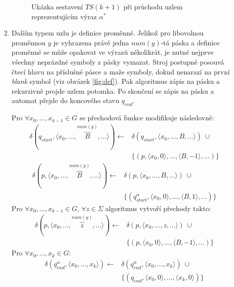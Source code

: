 \documentclass[thesis=B,czech]{FITthesis}[2019/12/23]
\theoremstyle{definition}
\begin{document}
\begin{enumerate}
\begin{enumerate}
\begin{figure}[ht]
\begin{tikzpicture}[scale=0.8]
	\end{tikzpicture}
	\caption{Ukázka sestavení $TS(k+1)$ při průchodu uzlem reprezentujícím výraz $\alpha^\ast$}
	\label{fig:iter}
\end{figure}

	 \item \label{itm:def}{Dalším typem uzlu je definice proměnné. Jelikož pro libovolnou proměnnou $y$ je vyhrazena právě jedna $num(y)$-tá páska a definice proměnné se může opakovat ve výrazů několikrát, je nutné nejprve všechny neprázdné symboly z pásky vymazat. Stroj postupně posouvá čtecí hlavu na příslušné pásce a maže symboly, dokud nenarazí na první \emph{blank} symbol (viz obrázek \ref{fig:def}). Pak algoritmus  zápis na pásku a rekurzivně projde uzlem potomka. Po skončení se  zápis na pásku a automat přejde do koncového stavu $q_{end}$. 

	Pro  $\forall x_0, \dots, x_{k-1} \in G$ se přechodová funkce modifikuje následovně:
		\begin{equation*}\begin{split}
		\delta(q_{start}, \langle  x_0, \dots, \overbrace{B}^{num(y)}, \dots \rangle)\leftarrow&\delta(q_{start}, \langle  x_0, \dots, B, \dots \rangle) \ \cup\\&\{(p, \langle x_0, 0\rangle, \dots, \langle B, -1\rangle, \dots)\}\end{split}\end{equation*}
		\begin{equation*}\begin{split}
		\delta(p, \langle  x_0, \dots, \overbrace{B}^{num(y)}, \dots \rangle)\leftarrow&\delta(p, \langle  x_0, \dots, B, \dots \rangle) \ \cup\\&\{(q_{start}^{\alpha}, \langle x_0, 0\rangle, \dots, \langle B, 1\rangle, \dots)\}\end{split}\end{equation*}
	Pro $\forall x_0, \dots, x_{k-1} \in G$,  $\forall z \in \Sigma$ algoritmus vytvoří přechody takto:
\begin{equation*}\begin{split}\delta(p, \langle  x_0, \dots, \overbrace{z}^{num(y)}, \dots \rangle)\leftarrow&\delta(p, \langle  x_0, \dots, z, \dots \rangle) \ \cup\\&\{(p, \langle x_0, 0\rangle, \dots, \langle B, -1\rangle, \dots)\}\end{split}\end{equation*}
		Pro $\forall x_0, \dots, x_{k} \in G$:
		\begin{equation*}\begin{split}\delta(q_{end}^{\alpha}, \langle  x_0, \dots, x_{k}\rangle)\leftarrow&\delta(q_{end}^{\alpha}, \langle  x_0, \dots, x_k\rangle) \ \cup \\ &\{(q_{end}, \langle x_0, 0\rangle, \dots, \langle x_k, 0\rangle)\} \end{split}\end{equation*}
	}
	

\end{enumerate}
\end{enumerate}
\end{document}

